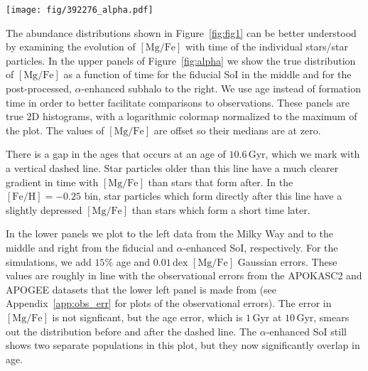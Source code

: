 \documentclass[linenumbers, twocolumn]{aastex631}
\newcommand{\Gyr}{\ensuremath{\textrm{Gyr}}}
\newcommand{\FeH}{\ensuremath{[\textrm{Fe}/\textrm{H}]}}
\newcommand{\MgFe}{\ensuremath{[\textrm{Mg}/\textrm{Fe}]}}
\newcommand{\dex}{\ensuremath{\textrm{dex}}}
\begin{document}
\begin{figure*}
  \centering
  \texttt{[image: fig/392276\_alpha.pdf]}
  \caption{\textbf{Bimodality in the abundance plane is linked to distinct epochs in simulation.} The upper panels show \MgFe{} as a function of age for our subhalo in TNG. The colors indicate stellar populations at fixed values of \FeH{}, which are the same as in Figure~\ref{fig:fig1}. A gap in the relation occurs at an age of approximately $10.6\,\Gyr$, which we indicate with a vertical dashed line. The effect of the $\alpha$-enhancement is clear, as it separates the stars that form before and after this gap in ages (star particles which formed before $z=1.5$ are $\alpha$-enhanced, which occurs at an age of $\sim9.5\,\Gyr$). The lower panels show on the left the Milky Way and on the center and right the data from TNG but with $15\%$ age errors and $0.01\,\dex$ errors in \MgFe{}. When the simulations are given these errors, we see that the before and after star particles smear such that the two populations significantly overlap in ages. In the $\alpha$-enhanced SoI, two populations emerge in each bin which overlapped in the fiducial distribution. This feature more closely resembles the Milky Way, which displays such populations where the bimodality is strongest -- $\FeH=-0.5$ (blue) and $-0.25$ (orange).}
  \label{fig:alpha}
\end{figure*}

The abundance distributions shown in Figure~\ref{fig:fig1} can be better understood by examining the evolution of \MgFe{} with time of the individual stars/star particles. In the upper panels of Figure~\ref{fig:alpha} we show the true distribution of \MgFe{} as a function of time for the fiducial SoI in the middle and for the post-processed, $\alpha$-enhanced subhalo to the right. We use age instead of formation time in order to better facilitate comparisons to observations. These panels are true 2D histograms, with a logarithmic colormap normalized to the maximum of the plot. The values of \MgFe{} are offset so their medians are at zero.

There is a gap in the ages that occurs at an age of $10.6\,\Gyr$, which we mark with a vertical dashed line. Star particles older than this line have a much clearer gradient in time with \MgFe{} than stars that form after. In the $\FeH=-0.25$ bin, star particles which form directly after this line have a slightly depressed \MgFe{} than stars which form a short time later.

In the lower panels we plot to the left data from the Milky Way and to the middle and right from the fiducial and $\alpha$-enhanced SoI, respectively. For the simulations, we add $15\%$ age and $0.01\,\dex$ \MgFe{} Gaussian errors. These values are roughly in line with the observational errors from the APOKASC2 and APOGEE datasets that the lower left panel is made from (see Appendix~\ref{app:obs_err} for plots of the observational errors). The error in \MgFe{} is not signficant, but the age error, which is $1\,\Gyr$ at $10\,\Gyr$, smears out the distribution before and after the dashed line. The $\alpha$-enhanced SoI still shows two separate populations in this plot, but they now significantly overlap in age.
\end{document}
